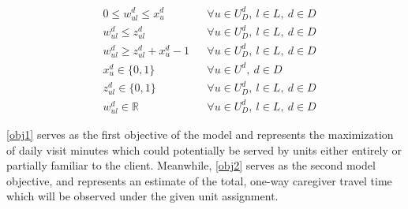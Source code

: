 \documentclass[11pt,twoside]{article}
\numberwithin{Theorem}{section}
\numberwithin{Definition}{section}
\numberwithin{Lemma}{section}
\numberwithin{Algorithm}{section}
\numberwithin{equation}{section}
\begin{document}
\begin{footnotesize}
\begin{align}
& 0 \leq w_{ul}^d \leq x_u^d 
&& \forall u \in U_D^d,\ l \in L,\ d \in D \label{wLin1} \\
& w_{ul}^d \leq z_{ul}^d
&& \forall u \in U_D^d,\ l \in L,\ d \in D  \label{wLin2} \\
& w_{ul}^d \geq z_{ul}^d + x_u^d - 1
&& \forall u \in U_D^d,\ l \in L,\ d \in D \label{wLin4} \\
& x_u^d \in \{0,1\}
&& \forall u \in U^d,\ d \in D \label{domX} \\
& z_{ul}^d \in \{0,1\}
&& \forall u \in U_D^d,\ l \in L,\ d \in D \label{domZ} \\
& w_{ul}^d \in \mathbb{R}
&& \forall u \in U_D^d,\ l \in L,\ d \in D \label{domW}
\end{align}
\end{footnotesize}

\eqref{obj1} serves as the first objective of the model and represents the maximization of daily visit minutes which could potentially be served by units either entirely or partially familiar to the client. Meanwhile, \eqref{obj2} serves as the second model objective, and represents an estimate of the total, one-way caregiver travel time which will be observed under the given unit assignment. 
\end{document}
